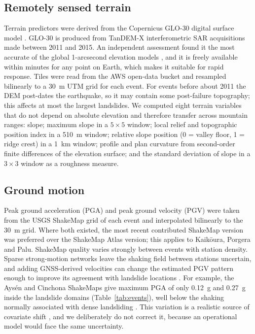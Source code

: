 \subsection{Remotely sensed terrain}
Terrain predictors were derived from the Copernicus GLO-30 digital surface model \citep{copdem}. GLO-30 is produced from TanDEM-X interferometric SAR acquisitions made between 2011 and 2015. An independent assessment found it the most accurate of the global 1-arcsecond elevation models \citep{guth2021}, and it is freely available within minutes for any point on Earth, which makes it suitable for rapid response. Tiles were read from the AWS open-data bucket and resampled bilinearly to a 30~m UTM grid for each event. For events before about 2011 the DEM post-dates the earthquake, so it may contain some post-failure topography; this affects at most the largest landslides. We computed eight terrain variables that do not depend on absolute elevation and therefore transfer across mountain ranges: slope; maximum slope in a $5\times5$ window; local relief and topographic position index in a 510~m window; relative slope position (0 = valley floor, 1 = ridge crest) in a 1~km window; profile and plan curvature from second-order finite differences of the elevation surface; and the standard deviation of slope in a $3\times3$ window as a roughness measure.

\subsection{Ground motion}
Peak ground acceleration (PGA) and peak ground velocity (PGV) were taken from the USGS ShakeMap grid of each event \citep{wald1999,worden2018} and interpolated bilinearly to the 30~m grid. Where both existed, the most recent contributed ShakeMap version was preferred over the ShakeMap Atlas version; this applies to Kaik\={o}ura, Porgera and Palu. ShakeMap quality varies strongly between events with station density. Sparse strong-motion networks leave the shaking field between stations uncertain, and adding GNSS-derived velocities can change the estimated PGV pattern enough to improve its agreement with landslide locations \citep{endo2026realtime}. For example, the Ays\'en and Cinchona ShakeMaps give maximum PGA of only 0.12~g and 0.27~g inside the landslide domains (Table~\ref{tab:events}), well below the shaking normally associated with dense landsliding \citep{keefer1984}. This variation is a realistic source of covariate shift \citep{shimodaira2000}, and we deliberately do not correct it, because an operational model would face the same uncertainty.

